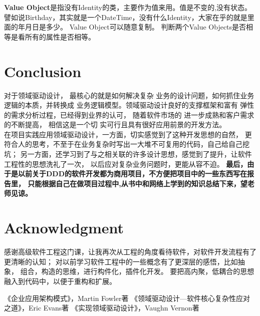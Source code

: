 \documentclass[journal]{IEEEtran}
\begin{document}
\begin{CJK*}{UTF8}{gbsn}
  

{\bfseries Value Object}是指没有Identity的类，主要作为值来用。值是不变的,没有状态。譬如说Birthday，其实就是一个DateTime，没有什么Identity，大家在乎的就是里面的年月日是多少。
Value Object可以随意复制。
判断两个Value Objects是否相等是看所有的属性是否相等。

 




 \section{Conclusion}
对于领域驱动设计， 最核心的就是如何解决复杂
业务的设计问题，如何抓住业务逻辑的本质，并转换成
业务逻辑模型。领域驱动设计良好的支撑框架和富有
弹性的需求分析过程，已经得到业界的认可，  随着软件市场的
进一步成熟和客户需求的不断提高， 相信这是一个切
实可行且具有很好应用前景的开发方法。
\\

 
在项目实践应用领域驱动设计，一方面，切实感觉到了这种开发思想的自然，
更符合人的思考，不至于在业务复杂时写出一大堆不可复用的代码，自己给自己挖坑；
另一方面，还学习到了与之相关联的许多设计思想，感觉到了提升，让软件工程性的思想洗礼了一次，
以后应对复杂业务问题时，更能从容不迫。
{\bfseries  最后，由于是以前关于DDD的软件开发都为商用项目，不方便把项目中的一些东西写在报告里，
只能根据自己在做项目过程中,从书中和网络上学到的知识总结下来，望老师见谅。}


 


\section*{Acknowledgment}
感谢高级软件工程这门课，让我再次从工程的角度看待软件，对软件开发流程有了更清晰的认知；
对以前学习软件工程中的一些概念有了更深层的感悟，比如抽象，
组合，构造的思维，进行构件化，插件化开发。
要把高内聚，低耦合的思想融入到代码中，以便于重构和扩展。


\ifCLASSOPTIONcaptionsoff
  \newpage
\fi



\begin{thebibliography}{1}
 
 
  《企业应用架构模式》，Martin Fowler著
  《领域驱动设计—软件核心复杂性应对之道》，Eric Evans著 
  《实现领域驱动设计》，Vaughn Vernon著
  
\end{thebibliography}

 
\clearpage
\end{CJK*}
\end{document}
